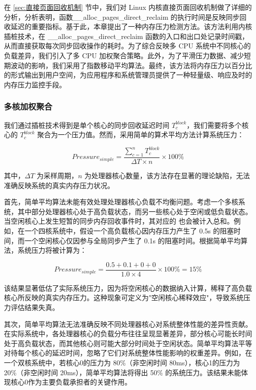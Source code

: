 在 \ref{sec:直接页面回收机制} 节中，我们对 Linux 内核直接页面回收机制做了详细的分析，分析表明，函数\_\_alloc\_pages\_direct\_reclaim 的执行时间是反映同步回收延迟的重要指标。基于此，本章提出了一种内存压力检测方法。该方法利用内核插桩技术，在 \_\_alloc\_pages\_direct\_reclaim 函数的入口和出口处记录时间戳，从而直接获取每次同步回收操作的耗时。为了综合反映多 CPU 系统中不同核心的负载差异，我们引入了多 CPU 加权聚合策略。此外，为了平滑压力数据、减少短期波动的影响，我们采用了指数移动平均算法。最终，该方法将内存压力以百分比的形式输出到用户空间，为应用程序和系统管理员提供了一种轻量级、响应及时的内存压力监控手段。

\subsubsection{多核加权聚合}

我们通过插桩技术得到是单个核心的同步回收延迟时间 \(T_c^{block}\)，我们需要将多个核心的 \(T_c^{block}\) 聚合为一个压力值。然而，采用简单的算术平均方法计算系统压力：

\[
Pressure_{simple} = \frac{\sum_{c=1}^{n} T_c^{block}}{\Delta T \times n} \times 100\%
\]

其中，\(\Delta T\) 为采样周期，\(n\) 为处理器核心数量，该方法存在显著的理论缺陷，无法准确反映系统的真实内存压力状况。

首先，简单平均算法未能有效处理处理器核心负载不均衡问题。考虑一个多核系统，其中部分处理器核心处于高负载状态，而另一些核心处于空闲或低负载状态。当空闲核心上发生短暂的同步内存回收事件时，其对应的  也会被计入总和。例如，在一个四核系统中，假设一个高负载核心因内存压力产生了 0.5s 的阻塞时间，而一个空闲核心仅因参与全局同步产生了 0.1s 的阻塞时间。根据简单平均算法，系统压力将被计算为：

\[
Pressure_{simple} = \frac{0.5 + 0.1 + 0 + 0}{1.0 \times 4} \times 100\% = 15\%
\]

该结果显著低估了实际系统压力，因为将空闲核心的数据纳入计算，稀释了高负载核心所反映的真实内存压力。这种现象可定义为"空闲核心稀释效应"，导致系统压力评估结果失真。

其次，简单平均算法无法准确反映不同处理器核心对系统整体性能的差异性贡献。在实际系统中，各处理器核心的负载分布往往呈现显著差异，部分核心可能长时间处于高负载状态，而其他核心则可能大部分时间处于空闲状态。简单平均算法平等对待每个核心的延迟时间，忽略了它们对系统整体性能影响的权重差异。例如，在一个双核系统中，若核心0的压力为 80\%（非空闲时间 80ms），核心1的压力为 20\%（非空闲时间 20ms），简单平均算法将得出 50\% 的系统压力。该结果未能体现核心0作为主要负载承担者的关键作用。

